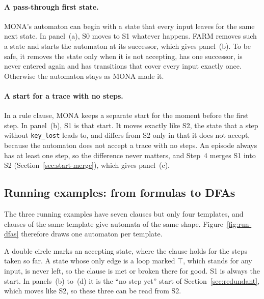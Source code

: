 \documentclass[11pt,english,listoffigures,listoftables]{tfgetsinf}
\begin{document}
\paragraph{A pass-through first state.} MONA's automaton can begin with a state that every input leaves for the same next state. In panel~(a), S0 moves to S1 whatever happens. FARM removes such a state and starts the automaton at its successor, which gives panel~(b). To be safe, it removes the state only when it is not accepting, has one successor, is never entered again and has transitions that cover every input exactly once. Otherwise the automaton stays as MONA made it.

\paragraph{A start for a trace with no steps.} In a rule clause, MONA keeps a separate start for the moment before the first step. In panel~(b), S1 is that start. It moves exactly like S2, the state that a step without \texttt{key\_lost} leads to, and differs from S2 only in that it does not accept, because the automaton does not accept a trace with no steps. An episode always has at least one step, so the difference never matters, and Step~4 merges S1 into S2 (Section~\ref{sec:start-merge}), which gives panel~(c).

\subsection{Running examples: from formulas to DFAs}
\label{sec:run-step2}
The three running examples have seven clauses but only four templates, and clauses of the same template give automata of the same shape. Figure~\ref{fig:run-dfas} therefore draws one automaton per template. 

A double circle marks an accepting state, where the clause holds for the steps taken so far. A state whose only edge is a loop marked $\top$, which stands for any input, is never left, so the clause is met or broken there for good. S1 is always the start. In panels~(b) to~(d) it is the ``no step yet'' start of Section~\ref{sec:redundant}, which moves like S2, so these three can be read from S2.
\end{document}
